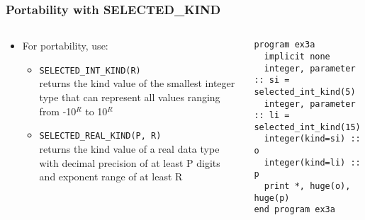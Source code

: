 \begin{frame}[fragile]
  \frametitle{Portability with SELECTED\_KIND}
  \begin{columns}[T]
    \begin{column}{0.43\textwidth}
      \begin{itemize}
        \item For portability, use:
          \begin{itemize}
          \vspace*{2mm}
            \item \texttt{SELECTED\_INT\_KIND(R)} \\
            returns the kind value of the smallest integer type that can represent all values ranging from -10$^R$ to 10$^R$
            \vspace*{2mm}
            \item \texttt{SELECTED\_REAL\_KIND(P, R)} \\
            returns the kind value of a real data type with decimal precision of at least P digits and exponent range of at least R
          \end{itemize}
      \end{itemize}
    \end{column}

    \begin{column}{0.57\textwidth}
      \begin{lstlisting}
program ex3a
  implicit none
  integer, parameter :: si = selected_int_kind(5)
  integer, parameter :: li = selected_int_kind(15)
  integer(kind=si) :: o
  integer(kind=li) :: p
  print *, huge(o), huge(p)
end program ex3a
      \end{lstlisting}
    \end{column}
  \end{columns}
\end{frame}


